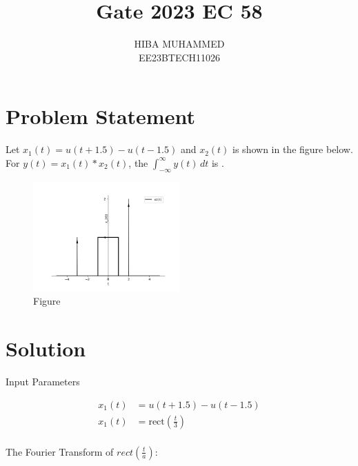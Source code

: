 \documentclass[journal,12pt,onecolumn]{IEEEtran}
\theoremstyle{remark}
\begin{document}
\let\vec\mathbf



\title{Gate 2023 EC 58}
\author{HIBA MUHAMMED\\
        EE23BTECH11026}
\maketitle

\section*{Problem Statement}
Let $x_1(t) = u(t + 1.5) - u(t - 1.5)$ and $x_2(t)$ is shown in the figure below. For $y(t) = x_1(t) * x_2(t)$, the $\int_{-\infty}^{\infty} y(t) \, dt$ is \underline{\hspace{2cm}}.

\begin{figure}[htbp]
    \centering
    \includegraphics[width=0.5\textwidth]{2023/EC/58/figs/gatefig.png}
    \caption{Figure}
    \label{fig:graph}
\end{figure}

\section*{Solution}
\fi
\begin{table}[htbp]
    \centering
    
    \caption{Input Parameters}
    \label{tab:gate_58table}
\end{table}

\begin{align}
x_1(t) &= u(t+1.5) - u(t-1.5) \\
x_1(t) &= \text{rect}\left(\frac{t}{3}\right) \\
\end{align}


The Fourier Transform of $rect\left(\frac{t}{a}\right)$:
\end{document}
